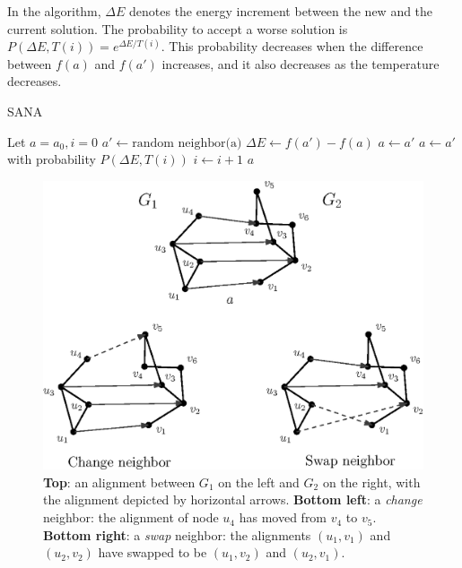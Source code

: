 \documentclass{bioinfo}
\begin{document}
\begin{methods}
In the algorithm, $\Delta E$ denotes the energy increment between the new and the current solution. The probability to accept a worse solution is $P(\Delta E, T(i)) = e^{\Delta E/T(i)}$. This probability decreases when the difference between $f(a)$ and $f(a')$ increases, and it also decreases as the temperature decreases.

\begin{algorithm}
\caption{SANA}\label{alg:SANA}
\begin{algorithmic}[1]
\State Let $a=a_0, i=0$
\State $a'\gets \mbox{random neighbor(a)}$
\State $\Delta E \gets f(a')-f(a)$
 $a\gets a'$
\Else \State $a\gets a'$ with probability $P(\Delta E, T(i))$
\EndIf
\State $i \gets i+1$
\EndWhile
\State \Return $a$
\end{algorithmic}
\end{algorithm}

\begin{figure}
\centering
\includegraphics[width=0.7\linewidth]{./operators.eps}
\caption{{\bf Top}: an alignment between $G_1$ on the left and $G_2$ on the right, with the alignment depicted by horizontal arrows.
{\bf Bottom left}: a {\it change} neighbor: the alignment of node $u_4$ has moved from $v_4$ to $v_5$.
{\bf Bottom right}: a {\it swap} neighbor: the alignments $(u_1,v_1)$ and $(u_2,v_2)$ have swapped to be $(u_1,v_2)$ and $(u_2,v_1)$.}
\label{fig:operators}
\end{figure}


\end{methods}
\end{document}
